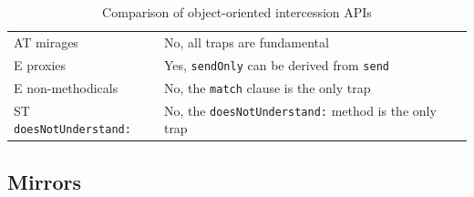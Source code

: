 \documentclass{sig-alternate}
\newcommand{\noSuchMethod}{\texttt{\_\_noSuchMethod\_\_}}
\begin{document}
\begin{table}
\begin{tabular}{|p{}|p{}|}
    AT mirages        & No, all traps are fundamental\\
    E proxies         & Yes, \texttt{sendOnly} can be derived from \texttt{send}\\
    E non-methodicals & No, the \texttt{match} clause is the only trap\\
    ST \texttt{doesNotUnderstand:}  & No, the \texttt{doesNotUnderstand:} method is the only trap\\
    \hline
  \end{tabular}
  \caption{Comparison of object-oriented intercession APIs}
  \label{tab:related_work}
\end{table}




\subsection{Mirrors}
\label{sub:mirrors}
\end{document}
